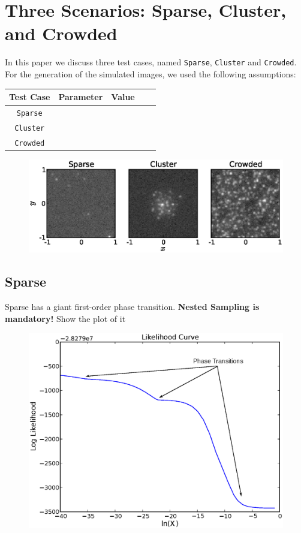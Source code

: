 \documentclass[letterpaper, 11pt]{article}
\newcommand{\sparse}{\texttt{Sparse}}
\newcommand{\cluster}{\texttt{Cluster}}
\newcommand{\crowded}{\texttt{Crowded}}
\begin{document}
\section{Three Scenarios: Sparse, Cluster, and Crowded}
In this paper we discuss three test cases, named \sparse, \cluster
and \crowded. For the generation of the simulated
images, we used the following assumptions:

\begin{table}
\begin{center}
\begin{tabular}{ccccc}
Test Case & Parameter & Value \\
\hline
\sparse \\
\cluster \\
\crowded
\end{tabular}
\end{center}
\end{table}

\begin{figure}
\hspace{-1cm}
\includegraphics{Figures/test_cases.eps}
\end{figure}

\subsection{Sparse}
Sparse has a giant first-order phase transition. {\bf Nested Sampling is
mandatory!} Show the plot of it

\begin{figure}
\begin{center}
\includegraphics[scale=0.7]{Figures/likelihood.eps}
\end{center}
\end{figure}
\end{document}
